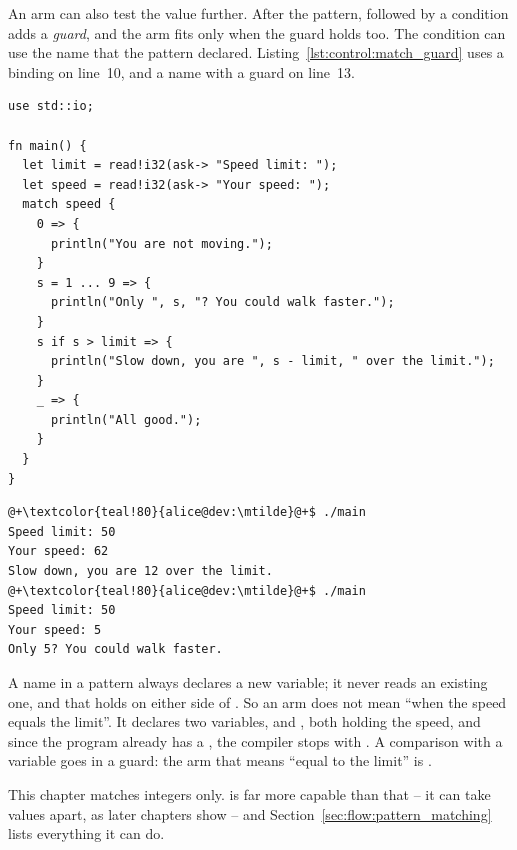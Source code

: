 An arm can also test the value further. After the pattern,  followed
by a condition adds a \textit{guard}, and the arm fits only when the guard holds
too. The condition can use the name that the pattern declared.
Listing~\ref{lst:control:match_guard} uses a binding on line~10, and a name
with a guard on line~13.

\begin{lstlisting}[style=coloredverbatim, caption=Arms with a binding and a guard, label=lst:control:match_guard]
use std::io;

fn main() {
  let limit = read!i32(ask-> "Speed limit: ");
  let speed = read!i32(ask-> "Your speed: ");
  match speed {
    0 => {
      println("You are not moving.");
    }
    s = 1 ... 9 => {
      println("Only ", s, "? You could walk faster.");
    }
    s if s > limit => {
      println("Slow down, you are ", s - limit, " over the limit.");
    }
    _ => {
      println("All good.");
    }
  }
}
\end{lstlisting}
\vspace{-10pt}%
\begin{lstlisting}[style=bashVerb, escapechar=@+]
@+\textcolor{teal!80}{alice@dev:\mtilde}@+$ ./main
Speed limit: 50
Your speed: 62
Slow down, you are 12 over the limit.
@+\textcolor{teal!80}{alice@dev:\mtilde}@+$ ./main
Speed limit: 50
Your speed: 5
Only 5? You could walk faster.
\end{lstlisting}

A name in a pattern always declares a new variable; it never reads an existing
one, and that holds on either side of \token{=}. So an arm
 does not mean ``when the speed equals the
limit''. It declares two variables,  and , both holding
the speed, and since the program already has a , the compiler stops
with . A comparison with a
variable goes in a guard: the arm that means ``equal to the limit'' is
.

This chapter matches integers only.  is far more capable than
that -- it can take values apart, as later chapters show -- and
Section~\ref{sec:flow:pattern_matching} lists everything it can do.
